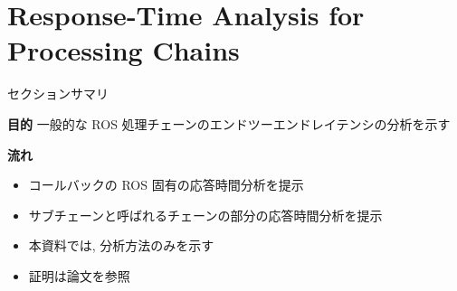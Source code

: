
\section{Response-Time Analysis for Processing Chains}
\label{sec: response-time analysis for processing chains}

\begin{frame}{セクションサマリ}
    \begin{itembox}[l]{\textbf{目的}}
        一般的な ROS 処理チェーンのエンドツーエンドレイテンシの分析を示す
    \end{itembox}
    \begin{itembox}[l]{\textbf{流れ}}
        \begin{itemize}
            \item コールバックの ROS 固有の応答時間分析を提示
            \item サブチェーンと呼ばれるチェーンの部分の応答時間分析を提示
        \end{itemize}
    \end{itembox}
\end{frame}

\begin{frame}{}
    \begin{itemize}
        \item 本資料では, 分析方法のみを示す
        \item 証明は論文を参照
    \end{itemize}
\end{frame}


